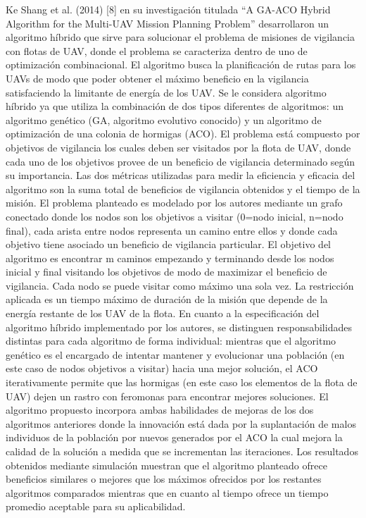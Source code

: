 Ke Shang et al. (2014) [8] en su investigación titulada “A GA-ACO Hybrid Algorithm for the Multi-UAV Mission Planning Problem” desarrollaron un algoritmo híbrido que sirve para solucionar el problema de misiones de vigilancia con flotas de UAV, donde el problema se caracteriza dentro de uno de optimización combinacional. El algoritmo busca la planificación de rutas para los UAVs de modo que poder obtener el máximo beneficio en la vigilancia satisfaciendo la limitante de energía de los UAV. Se le considera algoritmo híbrido ya que utiliza la combinación de dos tipos diferentes de algoritmos: un algoritmo genético (GA, algoritmo evolutivo conocido) y un algoritmo de optimización de una colonia de hormigas (ACO). El problema está compuesto por objetivos de vigilancia los cuales deben ser visitados por la flota de UAV, donde cada uno de los objetivos provee de un beneficio de vigilancia determinado según su importancia. Las dos métricas utilizadas para medir la eficiencia y eficacia del algoritmo son la suma total de beneficios de vigilancia obtenidos y el tiempo de la misión. El problema planteado es modelado por los autores mediante un grafo conectado donde los nodos son los objetivos a visitar (0=nodo inicial, n=nodo final), cada arista entre nodos representa un camino entre ellos y donde cada objetivo tiene asociado un beneficio de vigilancia particular. El objetivo del algoritmo es encontrar m caminos empezando y terminando desde los nodos inicial y final visitando los objetivos de modo de maximizar el beneficio de vigilancia. Cada nodo se puede visitar como máximo una sola vez. La restricción aplicada es un tiempo máximo de duración de la misión que depende de la energía restante de los UAV de la flota. 
En cuanto a la especificación del algoritmo híbrido implementado por los autores, se distinguen responsabilidades distintas para cada algoritmo de forma individual: mientras que el algoritmo genético es el encargado de intentar mantener y evolucionar una población (en este caso de nodos objetivos a visitar) hacia una mejor solución, el ACO iterativamente permite que las hormigas (en este caso los elementos de la flota de UAV) dejen un rastro con feromonas para encontrar mejores soluciones. El algoritmo propuesto incorpora ambas habilidades de mejoras de los dos algoritmos anteriores donde la innovación está dada por la suplantación de malos individuos de la población por nuevos generados por el ACO la cual mejora la calidad de la solución a medida que se incrementan las iteraciones. Los resultados obtenidos mediante simulación muestran que el algoritmo planteado ofrece beneficios similares o mejores que los máximos ofrecidos por los restantes algoritmos comparados mientras que en cuanto al tiempo ofrece un tiempo promedio aceptable para su aplicabilidad.


